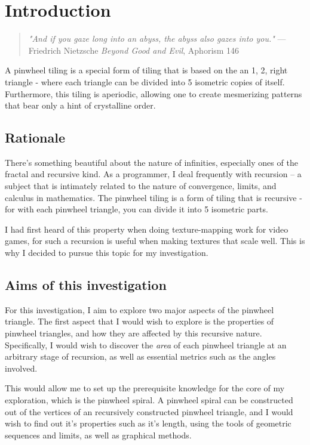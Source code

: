 \section{Introduction}
\begin{quotation}
    \emph{"And if you gaze long into an abyss, the abyss also gazes into you."}
    --- Friedrich Nietzsche \emph{Beyond Good and Evil}, Aphorism 146
\end{quotation}

\noindent
A pinwheel tiling is a special form of tiling that is based on the an 1, 2, right triangle - where each triangle can be divided into 5 isometric copies of itself. Furthermore, this tiling is aperiodic, allowing one to create mesmerizing patterns that bear only a hint of crystalline order.

\subsection{Rationale}
There's something beautiful about the nature of infinities, especially ones of the fractal and recursive kind. As a programmer, I deal frequently with recursion -- a subject that is intimately related to the nature of convergence, limits, and calculus in mathematics. The pinwheel tiling is a form of tiling that is recursive - for with each pinwheel triangle, you can divide it into 5 isometric parts.

I had first heard of this property when doing texture-mapping work for video games, for such a recursion is useful when making textures that scale well. This is why I decided to pursue this topic for my investigation.

\subsection{Aims of this investigation}
For this investigation, I aim to explore two major aspects of the pinwheel triangle. The first aspect that I would wish to explore is the properties of pinwheel triangles, and how they are affected by this recursive nature. Specifically, I would wish to discover the \emph{area} of each pinwheel triangle at an arbitrary stage of recursion, as well as essential metrics such as the angles involved.

This would allow me to set up the prerequisite knowledge for the core of my exploration, which is the pinwheel spiral. A pinwheel spiral can be constructed out of the vertices of an recursively constructed pinwheel triangle, and I would wish to find out it's properties such as it's length, using the tools of geometric sequences and limits, as well as graphical methods.

